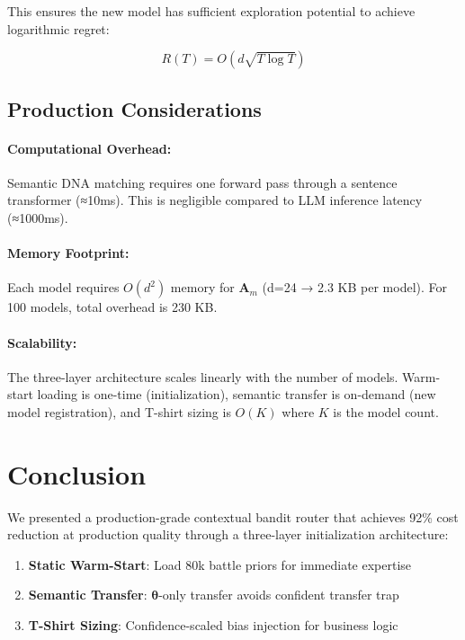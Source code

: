 \documentclass[sigconf]{acmart}
\begin{document}
This ensures the new model has sufficient exploration potential to achieve logarithmic regret:

\begin{equation}
R(T) = O\left( d\sqrt{T \log T} \right)
\end{equation}

\subsection{Production Considerations}

\paragraph{Computational Overhead:} Semantic DNA matching requires one forward pass through a sentence transformer (≈10ms). This is negligible compared to LLM inference latency (≈1000ms).

\paragraph{Memory Footprint:} Each model requires $O(d^2)$ memory for $\mathbf{A}_m$ (d=24 → 2.3 KB per model). For 100 models, total overhead is 230 KB.

\paragraph{Scalability:} The three-layer architecture scales linearly with the number of models. Warm-start loading is one-time (initialization), semantic transfer is on-demand (new model registration), and T-shirt sizing is $O(K)$ where $K$ is the model count.

\section{Conclusion}

We presented a production-grade contextual bandit router that achieves 92\% cost reduction at production quality through a three-layer initialization architecture:

\begin{enumerate}
    \item \textbf{Static Warm-Start}: Load 80k battle priors for immediate expertise
    \item \textbf{Semantic Transfer}: $\boldsymbol{\theta}$-only transfer avoids confident transfer trap
    \item \textbf{T-Shirt Sizing}: Confidence-scaled bias injection for business logic
\end{enumerate}
\end{document}
